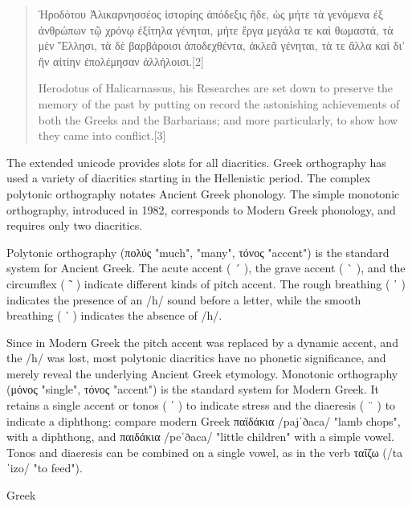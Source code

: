 \topline
\begin{quote}
Ἡροδότου Ἁλικαρνησσέος ἱστορίης ἀπόδεξις ἥδε, ὡς μήτε τὰ γενόμενα ἐξ ἀνθρώπων τῷ χρόνῳ ἐξίτηλα γένηται, μήτε ἔργα μεγάλα τε καὶ θωμαστά, τὰ μὲν Ἕλλησι, τὰ δὲ βαρβάροισι ἀποδεχθέντα, ἀκλεᾶ γένηται, τὰ τε ἄλλα καὶ δι' ἣν αἰτίην ἐπολέμησαν ἀλλήλοισι.[2]

Herodotus of Halicarnassus, his Researches are set down to preserve the memory of the past by putting on record the astonishing achievements of both the Greeks and the Barbarians; and more particularly, to show how they came into conflict.[3]
\end{quote}
\bottomline


The extended unicode provides slots for all diacritics. 
Greek orthography has used a variety of diacritics starting in the Hellenistic period. The complex polytonic orthography notates Ancient Greek phonology. The simple monotonic orthography, introduced in 1982, corresponds to Modern Greek phonology, and requires only two diacritics.

Polytonic orthography (πολύς "much", "many", τόνος "accent") is the standard system for Ancient Greek. The acute accent ( ´ ), the grave accent ( ` ), and the circumflex ( ῀ ) indicate different kinds of pitch accent. The rough breathing ( ῾ ) indicates the presence of an /h/ sound before a letter, while the smooth breathing ( ᾿ ) indicates the absence of /h/.

Since in Modern Greek the pitch accent was replaced by a dynamic accent, and the /h/ was lost, most polytonic diacritics have no phonetic significance, and merely reveal the underlying Ancient Greek etymology.
Monotonic orthography (μόνος "single", τόνος "accent") is the standard system for Modern Greek. It retains a single accent or tonos ( ΄ ) to indicate stress and the diaeresis ( ¨ ) to indicate a diphthong: compare modern Greek παϊδάκια /pajˈðaca/ "lamb chops", with a diphthong, and παιδάκια /peˈðaca/ "little children" with a simple vowel. Tonos and diaeresis can be combined on a single vowel, as in the verb ταΐζω (/taˈizo/ "to feed").

\medskip
\begin{scriptexample}[]{Greek}
\end{scriptexample}






\egroup
